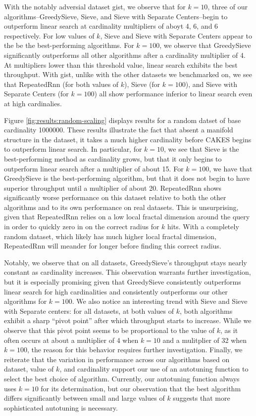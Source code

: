 With the notably adversial dataset gist, we observe that for $k=10$, three of our algorithms--GreedySieve, Sieve, and Sieve with Separate Centers--begin to outperform linear search at cardinality multipliers of aboyt 4, 6, and 6 respectively. 
For low values of $k$, Sieve and Sieve with Separate Centers appear to the be the best-performing algorithms. For $k=100$, we observe that GreedySieve significantly outperforms all other algorithms after a cardinality multiplier of 4. At multipliers lower than this threshold value, linear search exhibits the best throughput. With gist, unlike with the other datasets we benchmarked on, we see that RepeatedRnn (for both values of $k$), Sieve (for $k=100$), and Sieve with Separate Centers (for $k=100$) all show performance inferior to linear search even at high cardinalies. 

Figure \ref{fig:results:random-scaling} displays results for a random datset of base cardinality 1000000. 
These results illustrate the fact that absent a manifold structure in the dataset, it takes a much higher cardinality before CAKES begins to outperform linear search. 
In particular, for $k=10$, we see that Sieve is the best-performing method as cardinality grows, but that it only begins to outperform linear search after a multiplier of about 15. 
For $k=100$, we have that GreedySieve is the best-performing algorithm, but that it does not begin to have superior throughput until a multiplier of about 20. 
RepeatedRnn shows significantly worse performance on this dataset relative to both the other algorithms and to its own performance on real datasets. 
This is unsurprising, given that RepeatedRnn relies on a low local fractal dimension around the query in order to quickly zero in on the correct radius for $k$ hits. 
With a completely random dataset, which likely has much higher local fractal dimension, RepeatedRnn will meander for longer before finding this correct radius. 


Notably, we observe that on all datasets, GreedySieve's throughput stays nearly constant as cardinality increases. This observation warrants further investigation, but it is especially promising given that GreedySieve consistently outperforms linear search for high cardinalities and consistently outperforms our other algorithms for $k=100$. 
We also notice an interesting trend with Sieve and Sieve with Separate centers: for all datasets, at both values of $k$, both algorithms exhibit a sharp ``pivot point'' after which throughput starts to increase. 
While we observe that this pivot point seems to be proportional to the value of $k$, as it often occurs at about a multiplier of 4 when $k=10$ and a mulitplier of 32 when $k=100$, the reason for this behavior requires further investigation.  
Finally, we reiterate that the variation in performance across our algorithms based on dataset, value of $k$, and cardinality support our use of an autotuning function to select the best choice of algorithm. 
Currently, our autotuning function always uses $k=10$ for its determination, but our observation that the best algorithm differs significantly between small and large values of $k$ suggests that more sophisticated autotuning is necessary.


